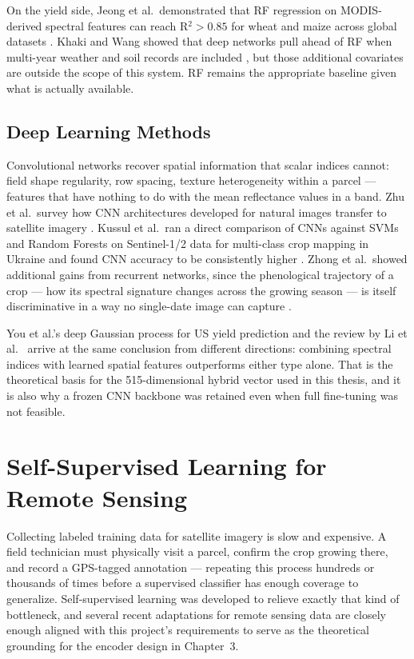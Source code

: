 \documentclass[12pt,a4paper,oneside]{report}
\begin{document}
On the yield side, Jeong et al.\ demonstrated that RF regression on MODIS-derived
spectral features can reach R$^2 > 0.85$ for wheat and maize across global datasets
\cite{jeong2016random}. Khaki and Wang showed that deep networks pull ahead of RF
when multi-year weather and soil records are included \cite{khaki2019crop}, but
those additional covariates are outside the scope of this system. RF remains the
appropriate baseline given what is actually available.

\subsection{Deep Learning Methods}

Convolutional networks recover spatial information that scalar indices cannot: field
shape regularity, row spacing, texture heterogeneity within a parcel — features that
have nothing to do with the mean reflectance values in a band. Zhu et al.\ survey
how CNN architectures developed for natural images transfer to satellite imagery
\cite{zhu2017deep}. Kussul et al.\ ran a direct comparison of CNNs against SVMs and
Random Forests on Sentinel-1/2 data for multi-class crop mapping in Ukraine and found
CNN accuracy to be consistently higher \cite{kussul2017deep}. Zhong et al.\ showed
additional gains from recurrent networks, since the phenological trajectory of a
crop — how its spectral signature changes across the growing season — is itself
discriminative in a way no single-date image can capture \cite{zhong2019deep}.

You et al.'s deep Gaussian process for US yield prediction \cite{you2017deep} and
the review by Li et al.\ \cite{li2024crop} arrive at the same conclusion from
different directions: combining spectral indices with learned spatial features
outperforms either type alone. That is the theoretical basis for the 515-dimensional
hybrid vector used in this thesis, and it is also why a frozen CNN backbone was
retained even when full fine-tuning was not feasible.

\section{Self-Supervised Learning for Remote Sensing}

Collecting labeled training data for satellite imagery is slow and expensive. A field technician must physically visit a parcel, confirm the crop growing there, and record a GPS-tagged annotation — repeating this process hundreds or thousands of times before a supervised classifier has enough coverage to generalize. Self-supervised learning was developed to relieve exactly that kind of bottleneck, and several recent adaptations for remote sensing data are closely enough aligned with this project's requirements to serve as the theoretical grounding for the encoder design in Chapter~3.
\end{document}
